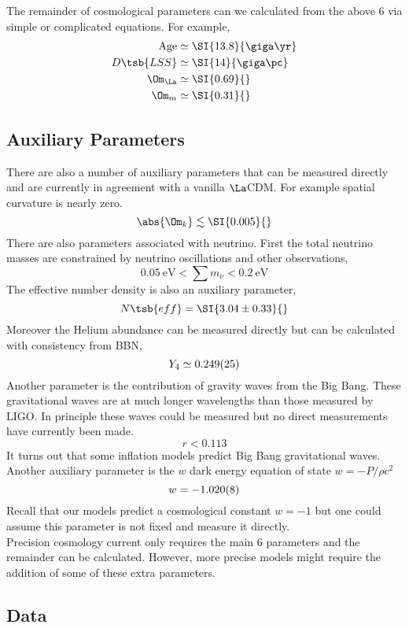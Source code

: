 \documentclass{article}
\begin{document}
The remainder of cosmological parameters can we calculated from the above $6$ via simple or complicated equations. For example,
\begin{align*}
    \text{Age} &\simeq \SI{13.8}{\giga\yr} \\
    D\tsb{LSS} &\simeq \SI{14}{\giga\pc} \\
    \Om_{\La} &\simeq \SI{0.69}{} \\
    \Om_{m} &\simeq \SI{0.31}{}
\end{align*}

\subsection{Auxiliary Parameters}
There are also a number of auxiliary parameters that can be measured directly and are currently in agreement with a vanilla $\La$CDM. For example spatial curvature is nearly zero.
\[ \abs{\Om_{k}} \lesssim \SI{0.005}{} \]
There are also parameters associated with neutrino. First the total neutrino masses are constrained by neutrino oscillations and other observations,
\[ \SI{0.05}{\eV} < \sum {m_{\nu}} < \SI{0.2}{\eV} \]
The effective number density is also an auxiliary parameter,
\[ N\tsb{eff} = \SI{3.04\pm0.33}{} \]
Moreover the Helium abundance can be measured directly but can be calculated with consistency from BBN,
\[ Y_4 \simeq \SI{0.249\pm0.025}{} \]
Another parameter is the contribution of gravity waves from the Big Bang. These gravitational waves are at much longer wavelengths than those measured by LIGO. In principle these waves could be measured but no direct measurements have currently been made.
\[ r < 0.113 \]
It turns out that some inflation models predict Big Bang gravitational waves.\\

Another auxiliary parameter is the $w$ dark energy equation of state $w = - P / \rho c^2$
\[ w = - \SI{1.02\pm0.008}{} \]
Recall that our models predict a cosmological constant $w = -1$ but one could assume this parameter is not fixed and measure it directly. \\

Precision cosmology current only requires the main $6$ parameters and the remainder can be calculated. However, more precise models might require the addition of some of these extra parameters.

\subsection{Data}
\end{document}
